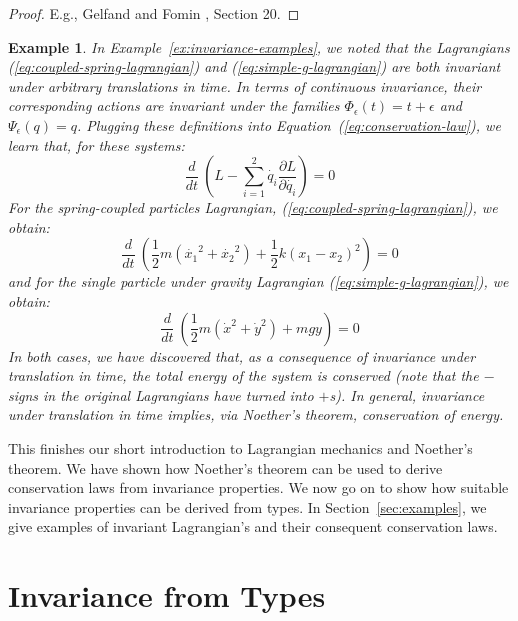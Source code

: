 \documentclass[preprint]{sigplanconf}
\theoremstyle{examplestyle}
\newtheorem{example}{Example}
\begin{document}
\begin{proof}
  E.g., Gelfand and Fomin \cite{gelfandXXcalculus}, Section 20.
\end{proof}

\begin{example}
  In Example~\ref{ex:invariance-examples}, we noted that the
  Lagrangians (\ref{eq:coupled-spring-lagrangian}) and
  (\ref{eq:simple-g-lagrangian}) are both invariant under arbitrary
  translations in time. In terms of continuous invariance, their
  corresponding actions are invariant under the families
  $\Phi_\epsilon(t) = t + \epsilon$ and $\Psi_\epsilon(q) =
  q$. Plugging these definitions into
  Equation~(\ref{eq:conservation-law}), we learn that, for these
  systems:
  \begin{displaymath}
    \frac{d}{dt}~\left(L - \sum_{i=1}^2 \dot{q_i}\frac{\partial L}{\partial \dot{q_i}} \right) = 0
  \end{displaymath}
  For the spring-coupled particles Lagrangian,
  (\ref{eq:coupled-spring-lagrangian}), we obtain:
  \begin{displaymath}
    \frac{d}{dt}~\left(\frac{1}{2}m(\dot{x_1}^2 + \dot{x_2}^2) + \frac{1}{2}k(x_1 - x_2)^2 \right) = 0
  \end{displaymath}
  and for the single particle under gravity Lagrangian
  (\ref{eq:simple-g-lagrangian}), we obtain:
  \begin{displaymath}
    \frac{d}{dt}~\left(\frac{1}{2}m(\dot{x}^2 + \dot{y}^2) + mgy\right) = 0
  \end{displaymath}
  In both cases, we have discovered that, as a consequence of
  invariance under translation in time, the total energy of the system
  is conserved (note that the $-$ signs in the original Lagrangians
  have turned into $+$s). In general, invariance under translation in
  time implies, via Noether's theorem, conservation of energy.
\end{example}

This finishes our short introduction to Lagrangian mechanics and
Noether's theorem. We have shown how Noether's theorem can be used to
derive conservation laws from invariance properties. We now go on to
show how suitable invariance properties can be derived from types. In
Section~\ref{sec:examples}, we give examples of invariant Lagrangian's
and their consequent conservation laws.

\section{Invariance from Types}
\label{sec:symmetry-from-types}
\end{document}
